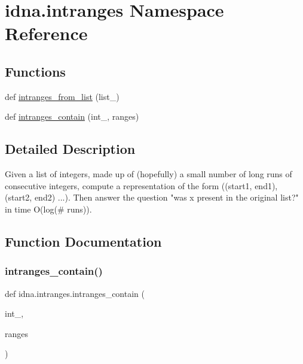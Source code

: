 \hypertarget{namespaceidna_1_1intranges}{}\section{idna.\+intranges Namespace Reference}
\label{namespaceidna_1_1intranges}
\subsection*{Functions}
\begin{DoxyCompactItemize}
\item 
def \hyperlink{namespaceidna_1_1intranges_afe9a6330ae836d03ecd3d9459adfabde}{intranges\+\_\+from\+\_\+list} (list\+\_\+)
\item 
def \hyperlink{namespaceidna_1_1intranges_a1260bdea3db80426aa918554f869857c}{intranges\+\_\+contain} (int\+\_\+, ranges)
\end{DoxyCompactItemize}


\subsection{Detailed Description}
\begin{DoxyVerb}Given a list of integers, made up of (hopefully) a small number of long runs
of consecutive integers, compute a representation of the form
((start1, end1), (start2, end2) ...). Then answer the question "was x present
in the original list?" in time O(log(# runs)).
\end{DoxyVerb}
 

\subsection{Function Documentation}
\mbox{\label{namespaceidna_1_1intranges_a1260bdea3db80426aa918554f869857c}} 
\subsubsection{\texorpdfstring{intranges\+\_\+contain()}{intranges\_contain()}}
{\footnotesize\ttfamily def idna.\+intranges.\+intranges\+\_\+contain (\begin{DoxyParamCaption}\item[{}]{int\+\_\+,  }\item[{}]{ranges }\end{DoxyParamCaption})}

